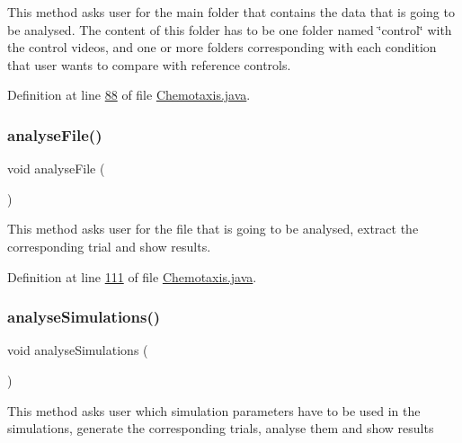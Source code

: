 This method asks user for the main folder that contains the data that is going to be analysed. The content of this folder has to be one folder named \char`\"{}control\char`\"{} with the control videos, and one or more folders corresponding with each condition that user wants to compare with reference controls. 

Definition at line \hyperlink{_chemotaxis_8java_source_l00088}{88} of file \hyperlink{_chemotaxis_8java_source}{Chemotaxis.\+java}.

\hypertarget{classanalysis_1_1_chemotaxis_a0b1464e818c4300782cb7e3322448f95}{}\label{classanalysis_1_1_chemotaxis_a0b1464e818c4300782cb7e3322448f95} 
\subsubsection{\texorpdfstring{analyse\+File()}{analyseFile()}}
{\footnotesize\ttfamily void analyse\+File (\begin{DoxyParamCaption}{ }\end{DoxyParamCaption})\hspace{0.3cm}{\ttfamily [private]}}

This method asks user for the file that is going to be analysed, extract the corresponding trial and show results. 

Definition at line \hyperlink{_chemotaxis_8java_source_l00111}{111} of file \hyperlink{_chemotaxis_8java_source}{Chemotaxis.\+java}.

\hypertarget{classanalysis_1_1_chemotaxis_ad992aa584aa410ee10b0b5df660c43ec}{}\label{classanalysis_1_1_chemotaxis_ad992aa584aa410ee10b0b5df660c43ec} 
\subsubsection{\texorpdfstring{analyse\+Simulations()}{analyseSimulations()}}
{\footnotesize\ttfamily void analyse\+Simulations (\begin{DoxyParamCaption}{ }\end{DoxyParamCaption})\hspace{0.3cm}{\ttfamily [private]}}

This method asks user which simulation parameters have to be used in the simulations, generate the corresponding trials, analyse them and show results 

